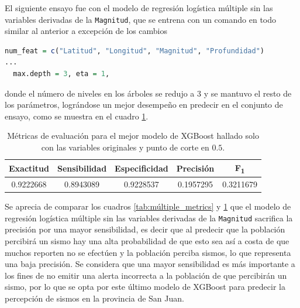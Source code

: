 \documentclass[a4paper]{report}
\begin{document}
El siguiente ensayo fue con el modelo de regresión logística múltiple sin las variables derivadas de la \verb'Magnitud', que se entrena con un comando en todo similar al anterior a excepción de los cambios
\begin{lstlisting}[language=R, breaklines=true]
num_feat = c("Latitud", "Longitud", "Magnitud", "Profundidad")
... 
  max.depth = 3, eta = 1, 
\end{lstlisting}
donde el número de niveles en los árboles se redujo a 3 y se mantuvo el resto de los parámetros, lográndose un mejor desempeño en predecir en el conjunto de ensayo, como se muestra en el cuadro \ref{tab:xgboost_metrics_sin_derivadas}.

\begin{table}[!ht]
	\centering
	\begin{tabular}{ccccc}
	\toprule
	Exactitud & Sensibilidad & Especificidad & Precisión & F\textsubscript{1} \\
	\midrule
	\num{0.9222668} & \num{0.8943089} & \num{0.9228537} & \num{0.1957295} & \num{0.3211679} \\
	\bottomrule
	\end{tabular}
	\caption{Métricas de evaluación para el mejor modelo de XGBoost hallado solo con las variables originales y punto de corte en \(0.5\).}
	\label{tab:xgboost_metrics_sin_derivadas}
\end{table}

Se aprecia de comparar los cuadros \ref{tab:múltiple_metrics} y \ref{tab:xgboost_metrics_sin_derivadas} que el modelo de regresión logística múltiple sin las variables derivadas de la \verb'Magnitud' sacrifica la precisión por una mayor sensibilidad, es decir que al predecir que la población percibirá un sismo hay una alta probabilidad de que esto sea así a costa de que muchos reporten no se efectúen y la población perciba sismos, lo que representa una baja precisión.
Se considera que una mayor sensibilidad es más importante a los fines de no emitir una alerta incorrecta a la población de que percibirán un sismo, por lo que se opta por este último modelo de XGBoost para predecir la percepción de sismos en la provincia de San Juan. 



\end{document}
